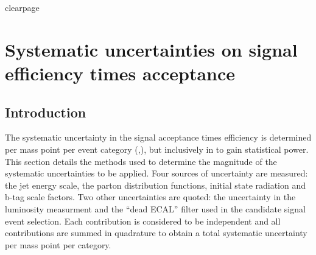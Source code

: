 %

clearpage
\section{Systematic uncertainties on signal efficiency times 
  acceptance\label{sec:sms-syst}}

\subsection{Introduction} 

The systematic uncertainty in the signal acceptance times efficiency
is determined per mass point per event category (\njet,\nb), but inclusively
in \scalht to gain statistical power. This section details the methods 
used to determine the magnitude of the systematic uncertainties to be applied. 
Four sources of uncertainty are measured: the jet energy scale,
the parton distribution functions, initial state radiation and b-tag scale
factors. Two other uncertainties are quoted: the uncertainty in the luminosity
measurment and the ``dead ECAL'' filter used in the candidate signal
event selection. Each contribution is considered to be independent 
and all contributions are summed in quadrature to obtain a total 
systematic uncertainty per mass point per category.

